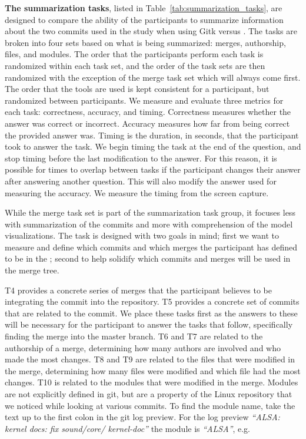 \textbf{The summarization tasks}, listed in
Table~\ref{tab:summarization_tasks}, are designed to compare the ability
of the participants to summarize information about the two commits used
in the study when using Gitk versus \tool. The tasks are broken into
four sets based on what is being summarized: merges, authorship, files,
and modules. The order that the participants perform each task is
randomized within each task set, and the order of the task sets are then
randomized with the exception of the merge task set which will always
come first. The order that the tools are used is kept consistent for a
participant, but randomized between participants. We measure and
evaluate three metrics for each task: correctness, accuracy, and timing.
Correctness measures whether the answer was correct or incorrect.
Accuracy measures how far from being correct the provided answer was.
Timing is the duration, in seconds, that the participant took to answer
the task. We begin timing the task at the end of the question, and stop
timing before the last modification to the answer. For this reason, it
is possible for times to overlap between tasks if the participant
changes their answer after answering another question. This will also
modify the answer used for measuring the accuracy. We measure the timing
from the screen capture.

While the merge task set is part of the summarization task group, it
focuses less with summarization of the commits and more with
comprehension of the model visualizations. The task is designed with two
goals in mind; first we want to measure and define which commits and
which merges the participant has defined to be in the \mt; second
to help solidify which commits and merges will be used in the merge
tree.

T4 provides a concrete series of merges that the participant believes to
be integrating the commit into the repository. T5 provides a concrete
set of commits that are related to the commit. We place these tasks
first as the answers to these will be necessary for the participant to
answer the tasks that follow, specifically finding the merge into the
master branch. T6 and T7 are related to the authorship of a merge,
determining how many authors are involved and who made the most changes.
T8 and T9 are related to the files that were modified in the merge,
determining how many files were modified and which file had the most
changes. T10 is related to the modules that were modified in the merge.
Modules are not explicitly defined in git, but are a property of the
Linux repository that we noticed while looking at various commits. To
find the module name, take the text up to the first colon in the git log
preview. For the log preview \textit{``ALSA: kernel docs: fix
  sound/core/ kernel-doc''} the module is \textit{``ALSA''}, e.g.

